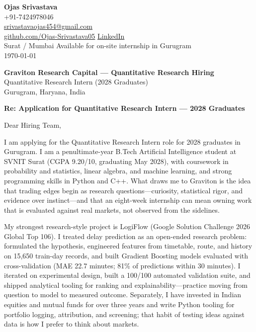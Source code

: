 \documentclass[a4paper,11pt]{article}
\begin{document}
\begin{flushright}
\textbf{Ojas Srivastava} \\
+91-7424978046 \\
\href{mailto:srivastavaojas454@gmail.com}{srivastavaojas454@gmail.com} \\
\href{https://github.com/Ojas-Srivastava05}{github.com/Ojas-Srivastava05} \textbar{}
\href{https://linkedin.com/in/ojas-srivastava05}{LinkedIn} \\
Surat / Mumbai \textbar{} Available for on-site internship in Gurugram \\
\today
\end{flushright}

\vspace{4mm}
\textbf{Graviton Research Capital --- Quantitative Research Hiring} \\
Quantitative Research Intern (2028 Graduates) \\
Gurugram, Haryana, India

\vspace{2mm}
\textbf{Re: Application for Quantitative Research Intern --- 2028 Graduates}

Dear Hiring Team,

I am applying for the Quantitative Research Intern role for 2028 graduates in Gurugram. I am a penultimate-year B.Tech Artificial Intelligence student at SVNIT Surat (CGPA 9.20/10, graduating May 2028), with coursework in probability and statistics, linear algebra, and machine learning, and strong programming skills in Python and C++. What draws me to Graviton is the idea that trading edges begin as research questions---curiosity, statistical rigor, and evidence over instinct---and that an eight-week internship can mean owning work that is evaluated against real markets, not observed from the sidelines.

My strongest research-style project is LogiFlow (Google Solution Challenge 2026 Global Top 106). I treated delay prediction as an open-ended research problem: formulated the hypothesis, engineered features from timetable, route, and history on 15,650 train-day records, and built Gradient Boosting models evaluated with cross-validation (MAE 22.7 minutes; 81\% of predictions within 30 minutes). I iterated on experimental design, built a 100/100 automated validation suite, and shipped analytical tooling for ranking and explainability---practice moving from question to model to measured outcome. Separately, I have invested in Indian equities and mutual funds for over three years and write Python tooling for portfolio logging, attribution, and screening; that habit of testing ideas against data is how I prefer to think about markets.
\end{document}
